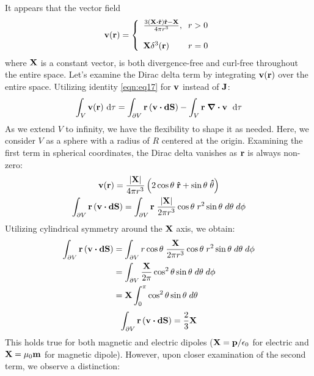 \documentclass{article}
\numberwithin{equation}{section}
\begin{document}
It appears that the vector field 
\begin{equation}
\label{eqn:eq41}
\vb{v}(\vb{r})=\left\{ \begin{array}{c}\frac{3\left( \vb{X}\vdot\vu{r}\right) \vu{r}-\vb{X}}{4\pi r^3},\;\;r>0\\\\\vb{X}\delta^3(\vb{r})\;\;\;\;\;\;\;\;r=0
\end{array}\right.
\end{equation}
where $\vb{X}$ is a constant vector, is both divergence-free and curl-free throughout the entire space. Let's examine the Dirac delta term by integrating $\vb{v}(\vb{r})$ over the entire space. Utilizing identity \eqref{eqn:eq17} for $\vb{v}$ instead of $\vb{J}$:
\begin{gather}
\int_V \vb{v}(\vb{r}) \ \dd\tau=\int_{\partial V} \vb{r}\left( \vb{v}\vdot\vb{dS}\right)-\int_V\vb{r}\;\div\vb{v}\;\ \dd\tau\nonumber
\end{gather}
As we extend $V$ to infinity, we have the flexibility to shape it as needed. Here, we consider $V$ as a sphere with a radius of $R$ centered at the origin. Examining the first term in spherical coordinates, the Dirac delta vanishes as $\vb{r}$ is always non-zero:
\begin{gather}
\vb{v}(\vb{r})=\frac{|\vb{X}|} {4\pi r^3}\left( 2\cos\theta \; \vu{r}+\sin\theta\;\vu{\theta}\right)\nonumber\\\int_{\partial V} \vb{r}\left(\vb{v}\vdot\vb{dS}\right)=\int_{\partial V}\vb{r} \; \frac{|\vb{X}|}{2\pi r^3}\cos\theta \;r^2 \sin\theta \;d\theta \;d\phi\nonumber
\end{gather}
Utilizing cylindrical symmetry around the $\vb{X}$ axis, we obtain:
\begin{align}
\int_{\partial V} \vb{r}\left(\vb{v}\vdot\vb{dS}\right)&=\int_{\partial V} r\cos\theta\; \frac{\vb{X}}{2\pi r^3}\cos\theta\;r^2\sin\theta \;d\theta \;d\phi\nonumber\\&=\int_{\partial V} \frac{\vb{X}}{2\pi}\cos^2\theta\sin\theta \;d\theta\; d\phi\nonumber\\&=\vb{X}\int_0^\pi\cos^2\theta\sin\theta\;d\theta\nonumber
\end{align}
\begin{equation}
\label{eqn:eq42}
\int_{\partial V} \vb{r}\left(\vb{v}\vdot\vb{dS}\right)=\frac{2}{3}\vb{X}
\end{equation}
This holds true for both magnetic and electric dipoles ($\vb{X}=\vb{p}/\epsilon_0$ for electric and $\vb{X}=\mu_0 \vb{m}$ for magnetic dipole). However, upon closer examination of the second term, we observe a distinction:
\end{document}

